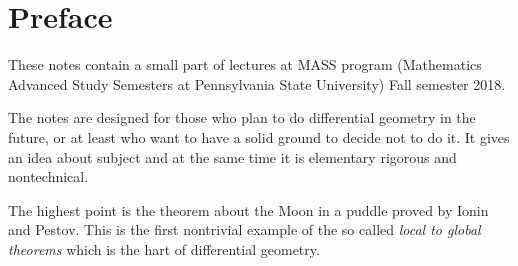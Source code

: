 
\chapter*{Preface}


 
These notes contain a small part of lectures at MASS program (Mathematics Advanced Study Semesters at Pennsylvania State University) Fall semester 2018.

The notes are designed for those who plan to do differential geometry in the future,
or at least who want to have a solid ground to decide not to do it.
It gives an idea about subject and at the same time it is elementary rigorous and nontechnical.

The highest point is the theorem about the Moon in a puddle proved by Ionin and Pestov.
This is the first nontrivial example of the so called \emph{local to global theorems} which is the hart of differential geometry.







